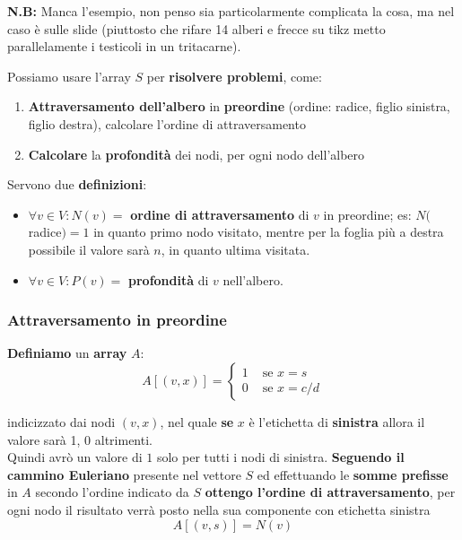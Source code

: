 	\vfill 
	
	\textbf{N.B:} Manca l'esempio, non penso sia particolarmente complicata la cosa, ma nel caso è sulle slide (piuttosto che rifare 14 alberi e frecce su tikz metto parallelamente i testicoli in un tritacarne).\\
	
	\newpage
	
	
	Possiamo usare l'array $S$ per \textbf{risolvere problemi}, come:
	\begin{enumerate}
		\item \textbf{Attraversamento dell'albero} in \textbf{preordine} (ordine: radice, figlio sinistra, figlio destra), calcolare l'ordine di attraversamento
		\item \textbf{Calcolare} la \textbf{profondità} dei nodi, per ogni nodo dell'albero
	\end{enumerate}
	
	Servono due \textbf{definizioni}:
	\begin{itemize}
		\item $\forall v \in V: N(v) =$ \textbf{ordine di attraversamento} di $v$ in preordine; es: $N($radice$) = 1$ in quanto primo nodo visitato, mentre per la foglia più a destra possibile il valore sarà $n$, in quanto ultima visitata.\\
		
		\item $\forall v \in V: P(v) =$ \textbf{profondità} di $v$ nell'albero.\\
	\end{itemize}
	
	\subsubsection{Attraversamento in preordine}
	
	\textbf{Definiamo} un \textbf{array} $A$: 
	$$ A [(v,x)] = \begin{cases}
		1 & \text{ se } x = s \\
		0 & \text{ se } x = c/d
	\end{cases}$$
	
	indicizzato dai nodi $(v,x)$, nel quale \textbf{se} $x$ è l'etichetta di \textbf{sinistra} allora il valore sarà 1, 0 altrimenti.\\
	
	Quindi avrò un valore di $1$ solo per tutti i nodi di sinistra. \textbf{Seguendo il cammino Euleriano} presente nel vettore $S$ ed effettuando le \textbf{somme prefisse} in $A$ secondo l'ordine indicato da $S$ \textbf{ottengo l'ordine di attraversamento}, per ogni nodo il risultato verrà posto nella sua componente con etichetta sinistra
	$$ A[(v,s)] = N(v) $$
	
